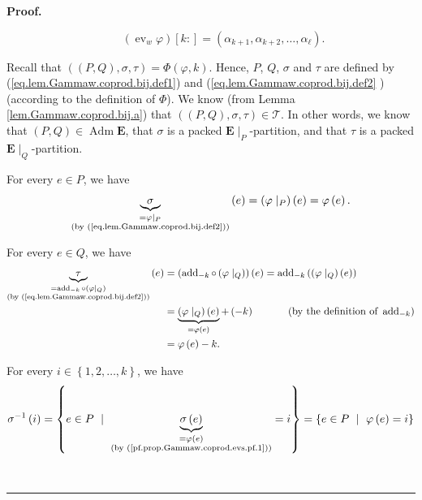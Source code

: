 \documentclass[numbers=enddot,12pt,final,onecolumn,notitlepage,abstracton]{scrartcl}
\theoremstyle{definition}
\newenvironment{proof}[1][Proof]{\noindent\textbf{#1.} }{\ \rule{0.5em}{0.5em}}
\newenvironment{verlong}{}{}
\newcommand{\Adm}{\operatorname{Adm}}
\newcommand{\EE}{{\mathbf{E}}}
\begin{document}
\begin{verlong}
\begin{proof}
{\[\ \ \ \ \ \ \ \ \ \ \left(  \operatorname{ev}_{w}\varphi\right)  \left[
k:\right]  =\left(  \alpha_{k+1},\alpha_{k+2},\ldots,\alpha_{\ell}\right)  .
\]
\par
Recall that $\left(  \left(  P,Q\right)  ,\sigma,\tau\right)  =\Phi\left(
\varphi,k\right)  $. Hence, $P$, $Q$, $\sigma$ and $\tau$ are defined by
(\ref{eq.lem.Gammaw.coprod.bij.def1}) and (\ref{eq.lem.Gammaw.coprod.bij.def2}%
) (according to the definition of $\Phi$). We know (from Lemma
\ref{lem.Gammaw.coprod.bij.a}) that $\left(  \left(  P,Q\right)  ,\sigma
,\tau\right)  \in\mathcal{T}$. In other words, we know that $\left(
P,Q\right)  \in \Adm \EE $, that $\sigma$ is a packed
$ \EE \mid_{P}$-partition, and that $\tau$ is a packed
$\EE\mid_{Q}$-partition.
\par
For every $e\in P$, we have%
\begin{equation}
\underbrace{\sigma}_{\substack{=\varphi\mid_{P}\\\text{(by
(\ref{eq.lem.Gammaw.coprod.bij.def2}))}}}\left(  e\right)  =\left(
\varphi\mid_{P}\right)  \left(  e\right)  =\varphi\left(  e\right)  .
\label{pf.prop.Gammaw.coprod.evs.pf.1}%
\end{equation}
\par
For every $e\in Q$, we have%
\begin{align}
\underbrace{\tau}_{\substack{=\operatorname{add}_{-k}\circ\left(
\varphi\mid_{Q}\right)  \\\text{(by (\ref{eq.lem.Gammaw.coprod.bij.def2}))}%
}}\left(  e\right)   &  =\left(  \operatorname{add}_{-k}\circ\left(
\varphi\mid_{Q}\right)  \right)  \left(  e\right)
= \operatorname{add}_{-k}
\left(  \left(  \varphi\mid_{Q}\right)  \left(  e\right)
\right) \nonumber\\
&  =\underbrace{\left(  \varphi\mid_{Q}\right)  \left(  e\right)  }%
_{=\varphi\left(  e\right)  }+\left(  -k\right)  \ \ \ \ \ \ \ \ \ \ \left(
\text{by the definition of }\operatorname{add}_{-k}\right)
\nonumber\\
&  =\varphi\left(  e\right)  -k. \label{pf.prop.Gammaw.coprod.evs.pf.2}%
\end{align}
\par
For every $i\in\left\{  1,2,\ldots,k\right\}  $, we have%
\begin{align}
\sigma^{-1}\left(  i\right)   &  =\left\{  e\in P\ \mid\ \underbrace{\sigma
\left(  e\right)  }_{\substack{=\varphi\left(  e\right)  \\\text{(by
(\ref{pf.prop.Gammaw.coprod.evs.pf.1}))}}}=i\right\}  =\left\{  e\in
P\ \mid\ \varphi\left(  e\right)  =i\right\} \nonumber\\

\end{align}}
\end{proof}
\end{verlong}
\end{document}
